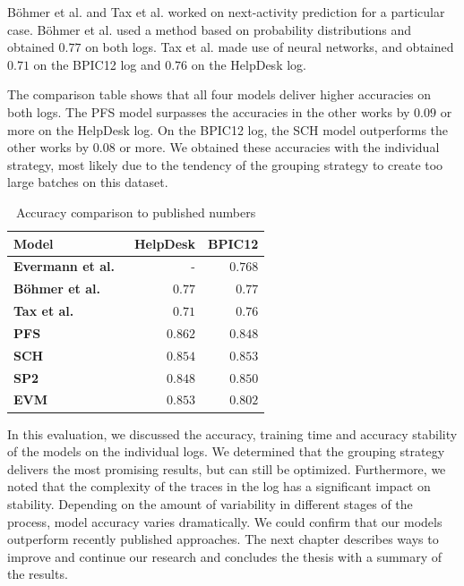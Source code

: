 Böhmer et al. and Tax et al. worked on next-activity prediction for a particular case.
Böhmer et al. used a method based on probability distributions and obtained $0.77$ on both logs.
Tax et al. made use of neural networks, and obtained $0.71$ on the BPIC12 log and $0.76$ on the HelpDesk log.

The comparison table shows that all four models deliver higher accuracies on both logs.
The PFS model surpasses the accuracies in the other works by $0.09$ or more on the HelpDesk log.
On the BPIC12 log, the SCH model outperforms the other works by $0.08$ or more.
We obtained these accuracies with the individual strategy, most likely due to the tendency of the grouping strategy to create too large batches on this dataset.\\

\begin{table}
\centering
\begin{tabular}{lrr}
\textbf{Model}  &  \textbf{HelpDesk} &  \textbf{BPIC12} \\
\midrule
\textbf{Evermann et al.~\cite{evermann2016}} & - & $0.768$\\
\textbf{Böhmer et al.~\cite{boehmer2018probability}  } & $0.77$ & $0.77$ \\
\textbf{Tax et al.~\cite{tax2017}} & $0.71$ & $0.76$\\
\hline
\textbf{PFS} & $0.862$ & $0.848$ \\
\textbf{SCH} & $0.854$ & $0.853$ \\
\textbf{SP2} & $0.848$ & $0.850$ \\
\textbf{EVM} & $0.853$ & $0.802$ \\
\end{tabular}
\caption{Accuracy comparison to published numbers}
\label{tab:accuracy-comparison}
\end{table}

In this evaluation, we discussed the accuracy, training time and accuracy stability of the models on the individual logs.
We determined that the grouping strategy delivers the most promising results, but can still be optimized.
Furthermore, we noted that the complexity of the traces in the log has a significant impact on stability.
Depending on the amount of variability in different stages of the process, model accuracy varies dramatically.
We could confirm that our models outperform recently published approaches.
The next chapter describes ways to improve and continue our research and concludes the thesis with a summary of the results.
